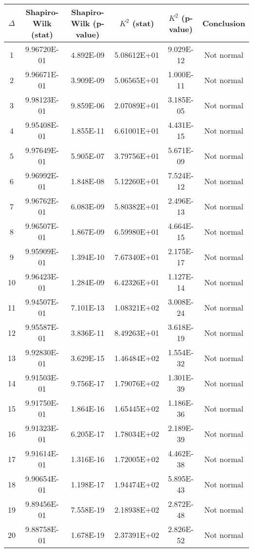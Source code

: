 \begin{table}[h]
	\begin{tabular}{|c|c|c|c|c|c|}
		\hline
		$\Delta$ &  Shapiro-Wilk (stat) & Shapiro-Wilk (p-value) & $K^2$ (stat) & $K^2$ (p-value) & Conclusion\\\hline
		\hline
		1 & 9.96720E-01 & 4.892E-09 & 5.08612E+01 & 9.029E-12 & Not normal\\\hline
		2 & 9.96671E-01 & 3.909E-09 & 5.06565E+01 & 1.000E-11 & Not normal\\\hline
		3 & 9.98123E-01 & 9.859E-06 & 2.07089E+01 & 3.185E-05 & Not normal\\\hline
		4 & 9.95408E-01 & 1.855E-11 & 6.61001E+01 & 4.431E-15 & Not normal\\\hline
		5 & 9.97649E-01 & 5.905E-07 & 3.79756E+01 & 5.671E-09 & Not normal\\\hline
		6 & 9.96992E-01 & 1.848E-08 & 5.12260E+01 & 7.524E-12 & Not normal\\\hline
		7 & 9.96762E-01 & 6.083E-09 & 5.80382E+01 & 2.496E-13 & Not normal\\\hline
		8 & 9.96507E-01 & 1.867E-09 & 6.59980E+01 & 4.664E-15 & Not normal\\\hline
		9 & 9.95909E-01 & 1.394E-10 & 7.67340E+01 & 2.175E-17 & Not normal\\\hline
		10 & 9.96423E-01 & 1.284E-09 & 6.42326E+01 & 1.127E-14 & Not normal\\\hline
		11 & 9.94507E-01 & 7.101E-13 & 1.08321E+02 & 3.008E-24 & Not normal\\\hline
		12 & 9.95587E-01 & 3.836E-11 & 8.49263E+01 & 3.618E-19 & Not normal\\\hline
		13 & 9.92830E-01 & 3.629E-15 & 1.46484E+02 & 1.554E-32 & Not normal\\\hline
		14 & 9.91503E-01 & 9.756E-17 & 1.79076E+02 & 1.301E-39 & Not normal\\\hline
		15 & 9.91750E-01 & 1.864E-16 & 1.65445E+02 & 1.186E-36 & Not normal\\\hline
		16 & 9.91323E-01 & 6.205E-17 & 1.78034E+02 & 2.189E-39 & Not normal\\\hline
		17 & 9.91614E-01 & 1.316E-16 & 1.72005E+02 & 4.462E-38 & Not normal\\\hline
		18 & 9.90654E-01 & 1.198E-17 & 1.94474E+02 & 5.895E-43 & Not normal\\\hline
		19 & 9.89456E-01 & 7.558E-19 & 2.18938E+02 & 2.872E-48 & Not normal\\\hline
		20 & 9.88758E-01 & 1.678E-19 & 2.37391E+02 & 2.826E-52 & Not normal\\\hline

\end{tabular}
\end{table}
